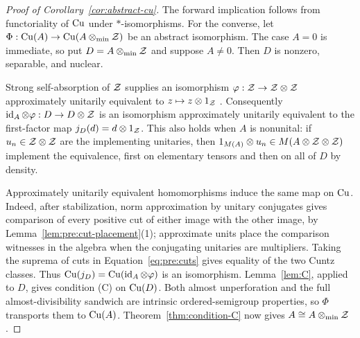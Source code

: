 \begin{proof}[Proof of Corollary~\ref{cor:abstract-cu}]
The forward implication follows from functoriality of $\mathrm{Cu}$ under
$*$-isomorphisms. For the converse, let
$\Phi:\mathrm{Cu}(A)\to\mathrm{Cu}(A\otimes_{\min}\mathcal Z)$ be an abstract isomorphism.
The case $A=0$ is immediate, so put $D=A\otimes_{\min}\mathcal Z$ and suppose
$A\ne0$. Then $D$ is nonzero, separable, and nuclear.

Strong self-absorption of $\mathcal Z$ supplies an isomorphism
$\varphi:\mathcal Z\to\mathcal Z\otimes\mathcal Z$ approximately unitarily equivalent to
$z\mapsto z\otimes1_\mathcal Z$
\cite[Definition~1.3(iv) and Example~1.14(iv)]{TW2007}.
Consequently $\operatorname{id}_A\otimes\varphi:D\to D\otimes\mathcal Z$ is an
isomorphism approximately unitarily equivalent to the first-factor
map $j_D(d)=d\otimes1_\mathcal Z$. This also holds when $A$ is nonunital:
if $u_n\in\mathcal Z\otimes\mathcal Z$ are the implementing unitaries, then
$1_{M(A)}\otimes u_n\in M(A\otimes\mathcal Z\otimes\mathcal Z)$ implement the
equivalence, first on elementary tensors and then on all of $D$ by
density.

Approximately unitarily equivalent homomorphisms induce the same
map on $\mathrm{Cu}$. Indeed, after stabilization, norm approximation by
unitary conjugates gives comparison of every positive cut of either
image with the other image, by
Lemma~\ref{lem:pre:cut-placement}(1); approximate units place the
comparison witnesses in the algebra when the conjugating unitaries
are multipliers. Taking the suprema of cuts in
Equation~\eqref{eq:pre:cuts} gives equality of the two Cuntz classes.
Thus $\mathrm{Cu}(j_D)=\mathrm{Cu}(\operatorname{id}_A\otimes\varphi)$ is an isomorphism.
Lemma~\ref{lem:C}, applied to $D$, gives condition \textup{(C)} on
$\mathrm{Cu}(D)$. Both almost unperforation and the full almost-divisibility
sandwich are intrinsic ordered-semigroup properties, so $\Phi$
transports them to $\mathrm{Cu}(A)$. Theorem~\ref{thm:condition-C} now gives
$A\cong A\otimes_{\min}\mathcal Z$.
\end{proof}
